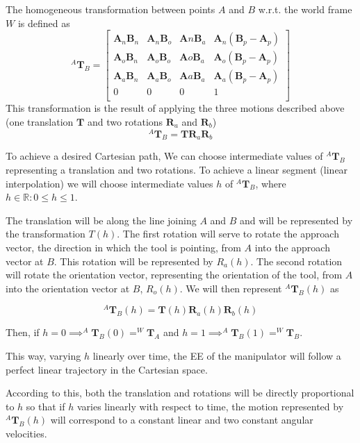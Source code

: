 \documentclass[10pt, aspectratio=169]{beamer}
\theoremstyle{remark}
\theoremstyle{definition}
\begin{document}
\begin{frame}[allowframebreaks]
\framebreak

The homogeneous transformation between points $A$ and $B$ w.r.t. the world frame $W$ is defined as
$$
^A\mathbf{T}_B = \left[\begin{matrix}
    \mathbf{A}_n\mathbf{B}_n & \mathbf{A}_n\mathbf{B}_o & \mathbf{A}n\mathbf{B}_a & \mathbf{A}_{n}(\mathbf{B}_p - \mathbf{A}_p) \\
    \mathbf{A}_o\mathbf{B}_n & \mathbf{A}_o\mathbf{B}_o & \mathbf{A}o\mathbf{B}_a & \mathbf{A}_{o}(\mathbf{B}_p - \mathbf{A}_p) \\
    \mathbf{A}_a\mathbf{B}_n & \mathbf{A}_a\mathbf{B}_o & \mathbf{A}a\mathbf{B}_a & \mathbf{A}_{a}(\mathbf{B}_p - \mathbf{A}_p) \\
    0 & 0 & 0 & 1 \\
\end{matrix}\right]
$$
This transformation is the result of applying the three motions described above (one translation $\mathbf{T}$ and two rotations $\mathbf{R}_a$ and $\mathbf{R}_b$)
$$
^A\mathbf{T}_B = \mathbf{T} \mathbf{R}_a \mathbf{R}_b
$$

To achieve a desired Cartesian path, We can choose intermediate values of $^A\mathbf{T}_B $ representing a translation and two rotations. To achieve a linear segment (linear interpolation) we will choose intermediate values $h$ of $^A\mathbf{T}_B$, where $h\in\mathbb{R} : 0\leq h \leq 1$. 

\framebreak

The translation will be along the line joining $A$ and $B$ and will be represented by the transformation $T(h)$. The first rotation will serve to rotate the approach vector, the direction in which the tool is pointing, from $A$ into the approach vector at $B$. This rotation will be represented by $R_a(h)$. The second rotation will rotate the orientation vector, representing the orientation of the tool, from $A$ into the orientation vector at $B$, $R_o(h)$. We will then represent $^A\mathbf{T}_B(h)$ as

$$
^A\mathbf{T}_B(h) = \mathbf{T}(h) \mathbf{R}_a(h) \mathbf{R}_b(h)
$$

Then, if $h=0 \implies ^A\mathbf{T}_B(0) = ^W\mathbf{T}_A$ and $h=1 \implies ^A\mathbf{T}_B(1) = ^W\mathbf{T}_B$.



\framebreak 

This way, varying $h$ linearly over time, the EE of the manipulator will follow a perfect linear trajectory in the Cartesian space.

According to this, both the translation and rotations will be directly proportional to $h$ so that if $h$ varies linearly with respect to time,  the motion represented by $^A\mathbf{T}_B(h)$ will correspond to a constant linear and two constant angular velocities. 
\end{frame}
\end{document}
